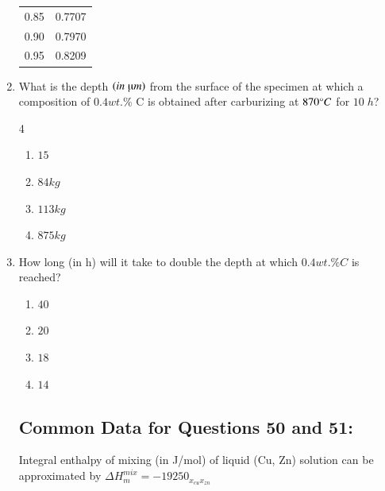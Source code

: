 \documentclass[journal]{IEEEtran}
\theoremstyle{remark}
\begin{document}
\begin{enumerate}
\begin{center}
\begin{tabular}{|c|c|}
\hline
0.85 & 0.7707 \\
0.90 & 0.7970 \\
0.95 & 0.8209 \\

\hline
\end{tabular}
\end{center}
\item   What is the depth $(in\; \micro m)$ from the surface of the specimen at which a composition of $0.4 wt.\%$ C is obtained after carburizing at $870\degree C$ for $10\; h$? 
\hfill{}

\begin {multicols}{4}
\begin{enumerate}
\item$ 15 $
\item $ 84  kg$
\item  $113  kg$ 
\item  $ 875  kg$
\end{enumerate}
\end{multicols}

\item  How long (in h) will it take to double the depth at which $0.4 wt.\% C$ is reached? 
\hfill{}
\begin{multicols}{4}
\begin{enumerate}
\item  $40 $
\item $20 $
\item $18 $
\item $ 14 $
\end{enumerate}
\end{multicols}
\subsection*{Common Data for Questions 50 and 51: }
Integral enthalpy of mixing (in J/mol) of liquid (Cu, Zn) solution can be approximated by $\Delta H^{mix}_m=-19250_{{x_{cu}}{x_{zn}}}$


\end{enumerate}
\end{document}

